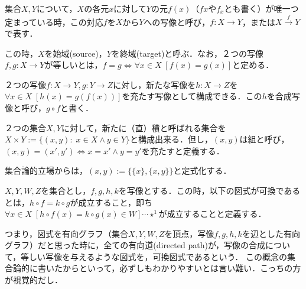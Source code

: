 \documentclass[uplatex, 12pt, dvipdfmx]{jsreport}
\begin{document}
\begin{shadebox}\begin{definition}[写像とその相等]集合$X,Y$について，$X$の各元$x$に対して$Y$の元$f(x)$（$fx$や$f_x$とも書く）が唯一つ定まっている時，この対応$f$を$X$から$Y$への写像と呼び，$f:X\rightarrow Y$，または$X\xrightarrow{f}Y$で表す．\end{definition}
この時，$X$を始域(source)，$Y$を終域(target)と呼ぶ．なお，２つの写像$f,g:X\rightarrow Y$が等しいとは，$f=g\Longleftrightarrow \forall x \in X \; [f(x)=g(x)]$と定める．
\begin{definition}[写像の合成]２つの写像$f:X\rightarrow Y, g:Y\rightarrow Z$に対し，新たな写像を$h:X\rightarrow Z$を$\forall x \in X \; [h(x)=g(f(x))]$を充たす写像として構成できる．この$h$を合成写像と呼び，$g\circ f$と書く．\end{definition}
\begin{definition}[集合の積]２つの集合$X,Y$に対して，新たに（直）積と呼ばれる集合を$X\times Y:=\{ (x,y) :\; x\in X \wedge y\in Y\}$と構成出来る．但し，$(x,y)$は組と呼び，$(x,y)=(x',y')\Longleftrightarrow x=x'\wedge y=y'$を充たすと定義する． \end{definition}\end{shadebox}

集合論的立場からは，$(x,y):=\{\{x\},\{x,y\}\}$と定式化する．

\begin{shadebox}\begin{definition}[写像の可換図式]$X,Y,W,Z$を集合とし，$f,g,h,k$を写像とする．この時，以下の図式が可換であるとは，$h\circ f=k\circ g$が成立すること，即ち$\forall x\in X \; [h\circ f(x)=k\circ g(x) \in W]\cdots\star^1$が成立することと定義する．
    \begin{center}\end{center}
\end{definition}\end{shadebox}
つまり，図式を有向グラフ（集合$X,Y,W,Z$を頂点，写像$f,g,h,k$を辺とした有向グラフ）だと思った時に，全ての有向道(directed path)が，写像の合成について，等しい写像を与えるような図式を，可換図式であるという．
この概念の集合論的に書いたからといって，必ずしもわかりやすいとは言い難い．こっちの方が視覚的だし．
\end{document}
